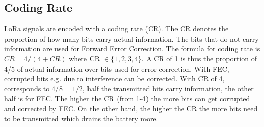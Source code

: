 \subsection{Coding Rate}
LoRa signals are encoded with a coding rate (CR). The CR denotes the proportion of how many bits carry actual information. The bits that do not carry information are used 
for Forward Error Correction. The formula for coding rate is $CR=4/(4 + CR)$ where CR $\in \{1,2,3,4\}$. A CR of 1 is thus the proportion of 4/5 of actual information over 
bits used for error correction\cite{SX_design_guide,coding_rate_mobilefish}.
With FEC, corrupted bits e.g. due to interference can be corrected. With CR of 4, corresponds to $4/8 = 1/2$, half the transmitted bits carry information, the other half is for FEC.
The higher the CR (from 1-4) the more bits can get corrupted and corrected by FEC.
On the other hand, the higher the CR the more bits need to be transmitted which drains the battery more.

